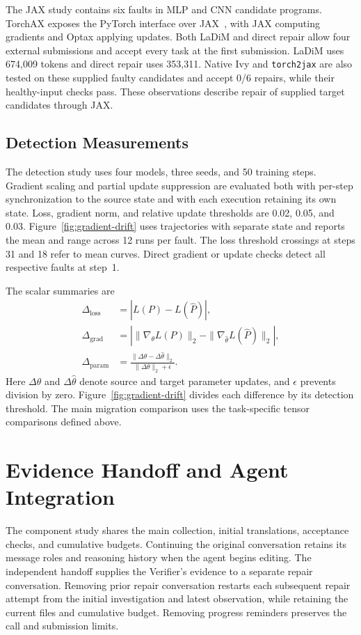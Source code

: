 The JAX study contains six faults in MLP and CNN candidate programs. TorchAX exposes the PyTorch interface over JAX~\citep{google2025torchax}, with JAX computing gradients and Optax applying updates. Both LaDiM and direct repair allow four external submissions and accept every task at the first submission. LaDiM uses 674,009 tokens and direct repair uses 353,311. Native Ivy and \texttt{torch2jax} are also tested on these supplied faulty candidates and accept 0/6 repairs, while their healthy-input checks pass. These observations describe repair of supplied target candidates through JAX.

\subsection{Detection Measurements}

The detection study uses four models, three seeds, and 50 training steps. Gradient scaling and partial update suppression are evaluated both with per-step synchronization to the source state and with each execution retaining its own state. Loss, gradient norm, and relative update thresholds are 0.02, 0.05, and 0.03. Figure~\ref{fig:gradient-drift} uses trajectories with separate state and reports the mean and range across 12 runs per fault. The loss threshold crossings at steps 31 and 18 refer to mean curves. Direct gradient or update checks detect all respective faults at step~1.

The scalar summaries are
\begin{align}
\Delta_{\mathrm{loss}} &= |L(P)-L(\hat P)|, \\
\Delta_{\mathrm{grad}} &= \left|\|\nabla_{\theta}L(P)\|_2-\|\nabla_{\hat\theta}L(\hat P)\|_2\right|, \\
\Delta_{\mathrm{param}} &= \frac{\|\Delta\theta-\Delta\hat\theta\|_2}{\|\Delta\theta\|_2+\epsilon}.
\end{align}
Here $\Delta\theta$ and $\Delta\hat\theta$ denote source and target parameter updates, and $\epsilon$ prevents division by zero. Figure~\ref{fig:gradient-drift} divides each difference by its detection threshold. The main migration comparison uses the task-specific tensor comparisons defined above.

\section{Evidence Handoff and Agent Integration}
\label{sec:component-study}

The component study shares the main collection, initial translations, acceptance checks, and cumulative budgets. Continuing the original conversation retains its message roles and reasoning history when the agent begins editing. The independent handoff supplies the Verifier's evidence to a separate repair conversation. Removing prior repair conversation restarts each subsequent repair attempt from the initial investigation and latest observation, while retaining the current files and cumulative budget. Removing progress reminders preserves the call and submission limits.

